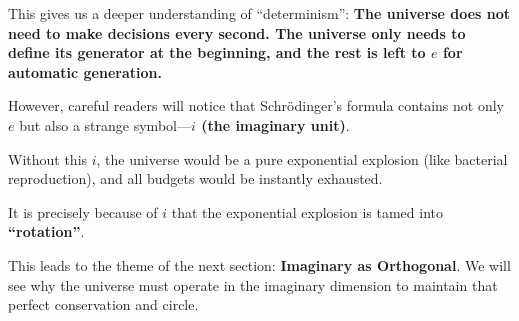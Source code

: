 This gives us a deeper understanding of ``determinism'': \textbf{The universe does not need to make decisions every second. The universe only needs to define its generator at the beginning, and the rest is left to $e$ for automatic generation.}

However, careful readers will notice that Schrödinger's formula contains not only $e$ but also a strange symbol---\textbf{$i$ (the imaginary unit)}.

Without this $i$, the universe would be a pure exponential explosion (like bacterial reproduction), and all budgets would be instantly exhausted.

It is precisely because of $i$ that the exponential explosion is tamed into \textbf{``rotation''}.

This leads to the theme of the next section: \textbf{Imaginary as Orthogonal}. We will see why the universe must operate in the imaginary dimension to maintain that perfect conservation and circle.

